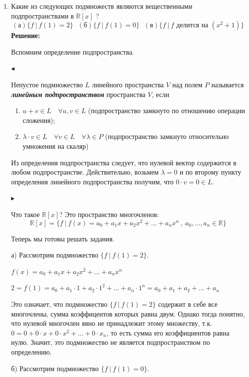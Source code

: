 \documentclass[]{book}
\theoremstyle{definition}
\newcommand{\bb}[1]{\mathbb{#1}}
\begin{document}
\begin{enumerate}[resume]
\item Какие из следующих подмножеств являются вещественными подпространствами в $\bb{R}[x]$ ?
$$(\text{а})\{f \ |\ f(1) =2\} \ \  \ (\text{б})\{f\ |\ f(1) = 0\} \ \ \ (\text{в})\{f\ |\ f  \text{ делится на } (x^2+1)\}$$
\textbf{Решение:}

Вспомним определение подпространства.

$\blacktriangleleft$ 

Непустое подмножество $L$ линейного пространства $V$ над полем $P$ называется \\ \textit{\textbf{линейным подпространством}}  пространства $V$, если

\begin{enumerate}
    \item $u + v \in L \quad \forall u, v \in L$ (подпространство замкнуто по отношению операции сложения);
    \item $\lambda\cdot v \in L \quad \forall v \in L \quad \forall \lambda \in P$ (подпространство замкнуто относительно умножения на скаляр)
\end{enumerate} 

Из определения подпространства следует, что нулевой вектор содержится в любом подпространстве. Действительно, возьмем $\lambda = 0$ и по второму пункту определения линейного подпространства получим, что $0\cdot v = 0 \in L$.

$\blacktriangleright$

Что такое $\bb{R}[x]$? Это пространство многочленов:
$$\bb{R}[x] = \{f \: | \: f(x) = a_0 + a_1x + a_2x^2 + ... + a_nx^n \ , \ a_0, ..., a_n \in \mathbb{R} \}$$

Теперь мы готовы решать задания.

а) Рассмотрим подмножество $\{f \ |\ f(1) =2\}$. 

$f(x) = a_0 + a_1x + a_2x^2 + ... + a_nx^n$

$2 = f(1) = a_0 + a_1\cdot 1 + a_2\cdot1^2 + \ldots + a_n\cdot1^n = a_0 + a_1 + a_2 + \ldots + a_n$

Это означает, что подмножество $\{f \ |\ f(1) =2\}$ содержит в себе все многочлены, сумма коэффицентов которых равна двум. Однако тогда понятно, что нулевой многочлен явно не принадлежит этому множеству, т.к. $0 = 0 + 0\cdot x + 0\cdot x^2 + \ldots + 0\cdot x_n$, то есть сумма его коэффициентов равна нулю. Значит, это подмножество не является подпространством по определению.

б) Рассмотрим подмножество $\{f \ |\ f(1) =0\}$. 


\end{enumerate}
\end{document}

